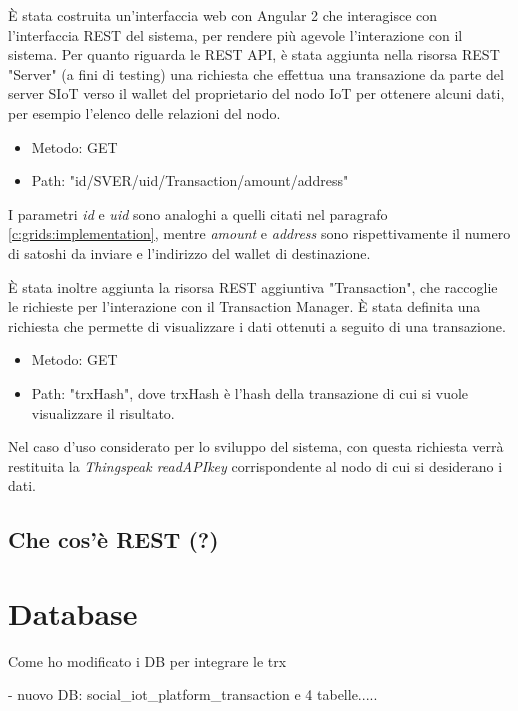 È stata costruita un'interfaccia web con Angular 2 che interagisce con l'interfaccia REST del sistema, per rendere più agevole l'interazione con il sistema.
Per quanto riguarda le REST API, è stata aggiunta nella risorsa REST "Server" (a fini di testing) una richiesta che effettua una transazione da parte del server SIoT verso il wallet del proprietario del nodo IoT per ottenere alcuni dati, per esempio l'elenco delle relazioni del nodo.
\begin{itemize}
    \item Metodo: GET
    \item Path: "{id}/SVER/{uid}/Transaction/{amount}/{address}"
\end{itemize}

I parametri \textit{id} e \textit{uid} sono analoghi a quelli citati nel paragrafo \ref{c:grids:implementation}, mentre \textit{amount} e \textit{address} sono rispettivamente il numero di satoshi da inviare e l'indirizzo del wallet di destinazione.

È stata inoltre aggiunta la risorsa REST aggiuntiva "Transaction", che raccoglie le richieste per l'interazione con il Transaction Manager. È stata definita una richiesta che permette di visualizzare i dati ottenuti a seguito di una transazione.
\begin{itemize}
    \item Metodo: GET
    \item Path: "{trxHash}", dove trxHash è l'hash della transazione di cui si vuole visualizzare il risultato.
\end{itemize}

Nel caso d'uso considerato per lo sviluppo del sistema, con questa richiesta verrà restituita la \textit{Thingspeak readAPIkey} corrispondente al nodo di cui si desiderano i dati.


\subsection{Che cos'è REST (?)}
\label{c:integr:webrest:boh}

\cite{FerreiraFilho2009}

\section{Database}
\label{c:integr:db}

Come ho modificato i DB per integrare le trx

- nuovo DB: social\_iot\_platform\_transaction e 4 tabelle.....

